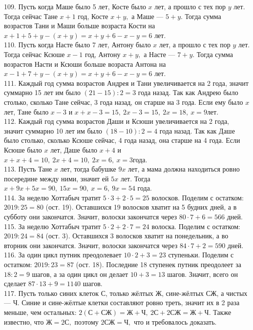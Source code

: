 \documentclass[12pt]{article}
\begin{document}
109. Пусть когда Маше было 5 лет, Косте было $x$ лет, а прошло с тех пор $y$ лет. Тогда сейчас Тане $x+1$ год, Косте $x+y,$ а Маше --- $5+y.$ Тогда сумма возрастов Тани и Маши больше возраста Кости на $x+1+5+y-(x+y)=x+y+6-x-y=6$ лет.\\
110. Пусть когда Насте было 7 лет, Антону было $x$ лет, а прошло с тех пор $y$ лет. Тогда сейчас Ксюше $x-1$ год, Антону $x+y,$ а Насте --- $7+y.$ Тогда сумма возрастов Насти и Ксюши больше возраста Антона на $x-1+7+y-(x+y)=x+y+6-x-y=6$ лет.\\
111. Каждый год сумма возрастов Андрея и Тани увеличивается на 2 года, значит суммарно 15 лет им было $(21-15):2=3$ года назад. Так как Андрею было столько, сколько Тане сейчас, 3 года назад, он старше на 3 года. Если ему было $x$ лет, Тане было $x-3$ и $x+x-3=15,\ 2x-3=15,\ 2x=18,\ x=9$лет.\\
112. Каждый год сумма возрастов Даши и Ксюши увеличивается на 2 года, значит суммарно 10 лет им было $(18-10):2=4$ года назад. Так как Даше было столько, сколько Ксюше сейчас, 4 года назад, она старше на 4 года. Если Ксюше было $x$ лет, Даше было $x+4$ и $x+x+4=10,\ 2x+4=10,\ 2x=6,\ x=3$года.\\
113. Пусть Тане $x$ лет, тогда бабушке $9x$ лет, а мама должна находиться ровно посередине между ними, значит ей $5x$ лет. Тогда $x+9x+5x=90,\ 15x=90,\ x=6,\ 9x=54$ года.\\
114. За неделю Хоттабыч тратит $5\cdot3+2\cdot5=25$ волосков. Поделим с остатком: $2019:25=80$ (ост. 19). Оставшихся 19 волосков хватит на 5 будних дней, а в субботу они закончатся. Значит, волоски закончатся через $80\cdot7+6=566$ дней.\\
115. За неделю Хоттабыч тратит $5\cdot2+2\cdot7=24$ волоска. Поделим с остатком: $2019:24=84$ (ост. 3). Оставшихся 3 волосков хватит на понедельник, а во вторник они закончатся. Значит, волоски закончатся через $84\cdot7+2=590$ дней.\\
116. За один цикл путник преодолевает $10\cdot2+3=23$ ступеньки. Поделим с остатком: $2019:23=87$ (ост. 18). Последние 18 ступенек путник преодолеет за $18:2=9$ шагов, а за один цикл он делает $10+3=13$ шагов. Значит, всего он сделает $87\cdot13+9=1140$ шагов.\\
117. Пусть только синих клеток С, только жёлтых Ж, сине-жёлтых СЖ, а чистых --- Ч. Синие и сине-жёлтые клетки составляют ровно треть, значит их в 2 раза меньше, чем остальных: $2(\text{С}+\text{СЖ})=\text{Ж}+\text{Ч},\ 2\text{С}+2\text{СЖ}=\text{Ж}+\text{Ч}.$ Также известно, что $\text{Ж}=2\text{С},$ поэтому $2\text{СЖ}=\text{Ч},$ что и требовалось доказать.\\
\end{document}
